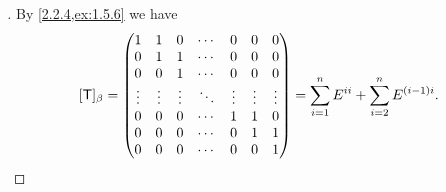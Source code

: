 \begin{proof}[]
  By \cref{2.2.4,ex:1.5.6} we have
  \[
    [\mathsf{T}]_{\beta} = \begin{pmatrix}
      1      & 1      & 0      & \cdots & 0      & 0      & 0      \\
      0      & 1      & 1      & \cdots & 0      & 0      & 0      \\
      0      & 0      & 1      & \cdots & 0      & 0      & 0      \\
      \vdots & \vdots & \vdots & \ddots & \vdots & \vdots & \vdots \\
      0      & 0      & 0      & \cdots & 1      & 1      & 0      \\
      0      & 0      & 0      & \cdots & 0      & 1      & 1      \\
      0      & 0      & 0      & \cdots & 0      & 0      & 1
    \end{pmatrix} = \sum_{i = 1}^n E^{i i} + \sum_{i = 2}^n E^{(i - 1) i}.
  \]
\end{proof}
